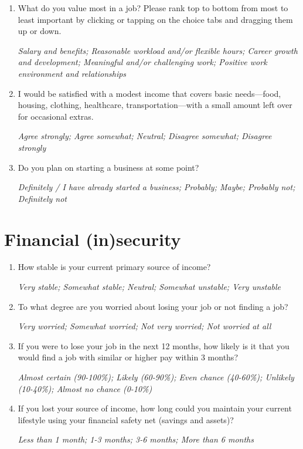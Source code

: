 \documentclass[11pt, headsepline]{article}
\begin{document}
\begin{enumerate}[resume]

    \item What do you value most in a job? Please rank top to bottom from most to least important by clicking or tapping on the choice tabs and dragging them up or down.

    \textit{Salary and benefits; Reasonable workload and/or flexible hours; Career growth and development; Meaningful and/or challenging work; Positive work environment and relationships}

    \item I would be satisfied with a modest income that covers basic needs—food, housing, clothing, healthcare, transportation—with a small amount left over for occasional extras.

    \textit{Agree strongly; Agree somewhat; Neutral; Disagree somewhat; Disagree strongly}

    \item Do you plan on starting a business at some point?

    \textit{Definitely / I have already started a business; Probably; Maybe; Probably not; Definitely not}

\end{enumerate}

\section*{Financial (in)security}

\begin{enumerate}[resume]

    \item How stable is your current primary source of income?

    \textit{Very stable; Somewhat stable; Neutral; Somewhat unstable; Very unstable}

    \item To what degree are you worried about losing your job or not finding a job?

    \textit{Very worried; Somewhat worried; Not very worried; Not worried at all}

    \item If you were to lose your job in the next 12 months, how likely is it that you would find a job with similar or higher pay within 3 months?

    \textit{Almost certain (90-100\%); Likely (60-90\%); Even chance (40-60\%); Unlikely (10-40\%); Almost no chance (0-10\%)}

    \item If you lost your source of income, how long could you maintain your current lifestyle using your financial safety net (savings and assets)?

    \textit{Less than 1 month; 1-3 months; 3-6 months; More than 6 months}

\end{enumerate}
\end{document}
